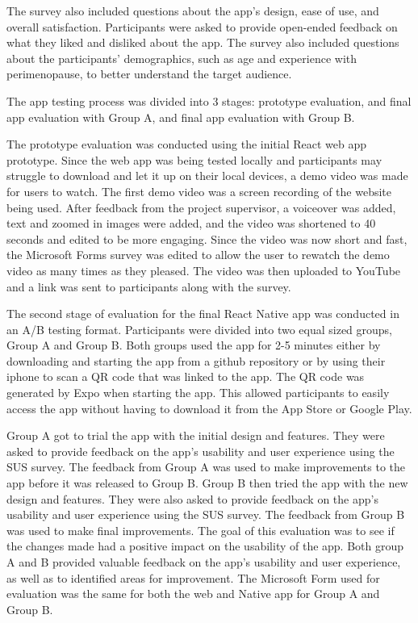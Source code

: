 The survey also included questions about the app's design, ease of use, and overall satisfaction. Participants were asked to provide open-ended feedback on what they liked and disliked about the app. The survey also included questions about the participants' demographics, such as age and experience with perimenopause, to better understand the target audience.

The app testing process was divided into 3 stages: prototype evaluation, and final app evaluation with Group A, and final app evaluation with Group B. 

The prototype evaluation was conducted using the initial React web app prototype. Since the web app was being tested locally and participants may struggle to download and let it up on their local devices, a demo video was made for users to watch. The first demo video was a screen recording of the website being used. After feedback from the project supervisor, a voiceover was added, text and zoomed in images were added, and the video was shortened to 40 seconds and edited to be more engaging. Since the video was now short and fast, the Microsoft Forms survey was edited to allow the user to rewatch the demo video as many times as they pleased. The video was then uploaded to YouTube and a link was sent to participants along with the survey. 

The second stage of evaluation for the final React Native app was conducted in an A/B testing format. Participants were divided into two equal sized groups, Group A and Group B. 
Both groups used the app for 2-5 minutes either by downloading and starting the app from a github repository or by using their iphone to scan a QR code that was linked to the app. The QR code was generated by Expo when starting the app. This allowed participants to easily access the app without having to download it from the App Store or Google Play. 

Group A got to trial the app with the initial design and features. They were asked to provide feedback on the app's usability and user experience using the SUS survey. The feedback from Group A was used to make improvements to the app before it was released to Group B. Group B then tried the app with the new design and features. They were also asked to provide feedback on the app's usability and user experience using the SUS survey. The feedback from Group B was used to make final improvements. The goal of this evaluation was to see if the changes made had a positive impact on the usability of the app. Both group A and B provided valuable feedback on the app's usability and user experience, as well as to identified areas for improvement. The Microsoft Form used for evaluation was the same for both the web and Native app for Group A and Group B. 


